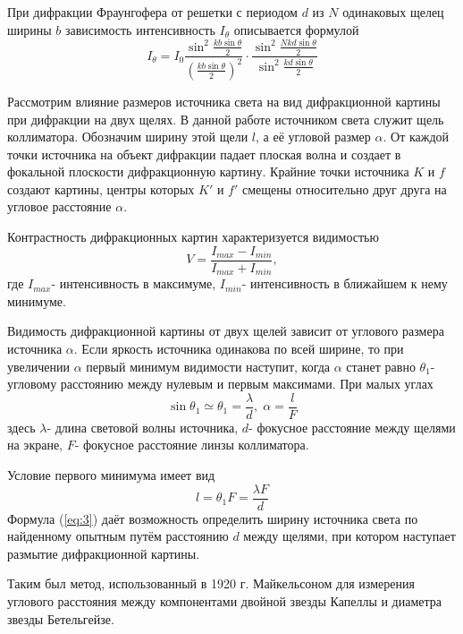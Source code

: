 При дифракции Фраунгофера от решетки с периодом $d$ из $N$ одинаковых щелец ширины $b$ зависимость интенсивность $I_{\theta}$ описывается формулой
\begin{equation}
	I_{\theta}=I_0\frac{\sin^2\frac{kb\sin\theta}{2}}{(\frac{kb\sin\theta}{2})^2}
	\cdot
	\frac{\sin^2\frac{Nkd\sin{\theta}}{2}}{\sin^2\frac{kd\sin{\theta}}{2}}	
\end{equation}

Рассмотрим влияние размеров источника света на вид дифракционной картины при дифракции на двух щелях. В данной работе источником света служит щель коллиматора. Обозначим ширину этой щели $l$, а её угловой размер $\alpha$. %
От каждой точки источника на объект дифракции падает плоская волна и создает в фокальной плоскости дифракционную картину. Крайние точки источника $K$ и $f$ создают картины, центры которых $K'$ и $f'$ смещены относительно друг друга на угловое расстояние $\alpha$. %

Контрастность дифракционных картин характеризуется видимостью
\begin{equation}
	V=\frac{I_{max}-I_{min}}{I_{max}+I_{min}},
\end{equation}
где $I_{max}$- интенсивность в максимуме, $I_{min}$- интенсивность в ближайшем к нему минимуме.

Видимость дифракционной картины от двух щелей зависит от углового размера источника $\alpha$. Если яркость источника одинакова по всей ширине, то при увеличении $\alpha$ первый минимум видимости наступит, когда $\alpha$ станет равно $\theta_1$- угловому расстоянию между нулевым и первым максимами. При малых углах
\begin{equation}
	\sin{\theta_1}\simeq\theta_1=\frac{\lambda}{d},\; \alpha=\frac{l}{F}
\end{equation}
здесь $\lambda$- длина световой волны источника, $d$- фокусное расстояние между щелями на экране, $F$- фокусное расстояние линзы коллиматора.

Условие первого минимума имеет вид
\begin{equation}
	\label{eq:3}
	l=\theta_1F=\frac{\lambda F}{d}
\end{equation}
Формула (\ref{eq:3}) даёт возможность определить ширину источника света по найденному опытным путём расстоянию $d$ между щелями, при котором наступает размытие дифракционной картины.

Таким был метод, использованный в 1920 г. Майкельсоном для измерения углового расстояния между компонентами двойной звезды Капеллы и диаметра звезды Бетельгейзе.

